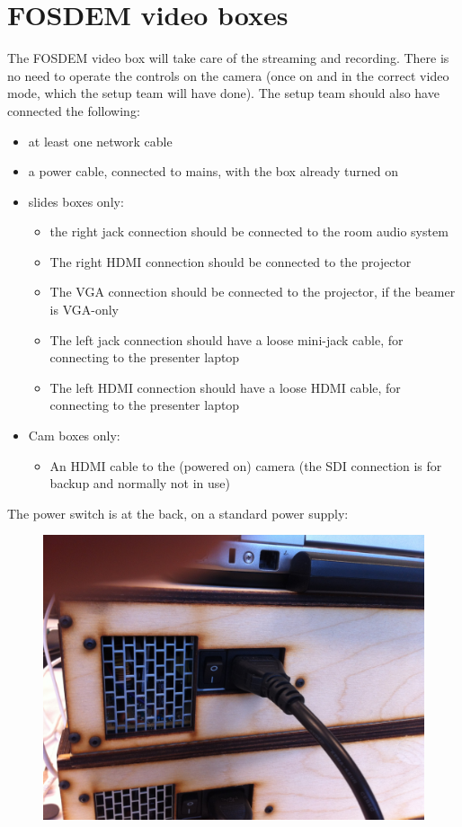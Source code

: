 \documentclass{article}
\begin{document}
\section{FOSDEM video boxes}
The FOSDEM video box will take care of the streaming and recording.
There is no need to operate the controls on the camera (once on and in the correct video mode, which the setup team will have done). The setup team should also have connected the following:
\begin{itemize}
  \item at least one network cable
  \item a power cable, connected to mains, with the box already turned on
  \item slides boxes only:
    \begin{itemize}
      \item the right jack connection should be connected to the room audio system
      \item The right HDMI connection should be connected to the projector
      \item The VGA connection should be connected to the projector, if the beamer is VGA-only
      \item The left jack connection should have a loose mini-jack cable, for connecting to the presenter laptop
      \item The left HDMI connection should have a loose HDMI cable, for connecting to the presenter laptop
    \end{itemize}
  \item Cam boxes only:
    \begin{itemize}
      \item An HDMI cable to the (powered on) camera (the SDI connection is for backup and normally not in use)
    \end{itemize}
\end{itemize}

The power switch is at the back, on a standard power supply:
\begin{figure}[H]
  \centering
  \includegraphics[width = 120mm]{videobox_psu.jpg}
\end{figure}
\end{document}
